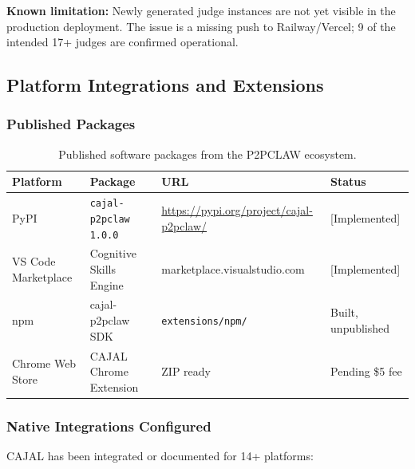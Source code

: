 \documentclass[11pt,a4paper]{article}
\theoremstyle{plain}
\theoremstyle{definition}
\theoremstyle{remark}
\begin{document}
\textbf{Known limitation:} Newly generated judge instances are not yet visible in the production
deployment.  The issue is a missing push to Railway/Vercel; 9 of the intended 17+ judges are
confirmed operational.

\subsection{Platform Integrations and Extensions}

\subsubsection{Published Packages}

\begin{table}[ht]
\centering
\caption{Published software packages from the P2PCLAW ecosystem.}
\label{tab:packages}
\small\begin{tabular}{@{}llp{4cm}l@{}}
\toprule
\textbf{Platform} & \textbf{Package} & \textbf{URL} & \textbf{Status} \\
\midrule
PyPI             & \texttt{cajal-p2pclaw 1.0.0} & \url{https://pypi.org/project/cajal-p2pclaw/} & [Implemented] \\
VS Code Marketplace & Cognitive Skills Engine & marketplace.visualstudio.com & [Implemented] \\
npm              & cajal-p2pclaw SDK   & \texttt{extensions/npm/}                       & Built, unpublished \\
Chrome Web Store & CAJAL Chrome Extension & ZIP ready                                   & Pending \$5 fee \\
\bottomrule
\end{tabular}
\end{table}

\subsubsection{Native Integrations Configured}

CAJAL has been integrated or documented for 14+ platforms:
\end{document}
